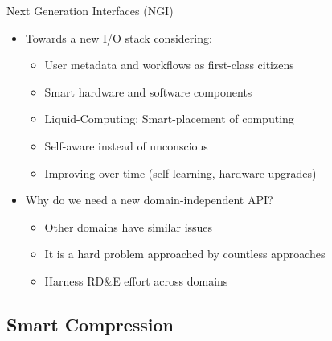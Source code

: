 \documentclass[compress,11pt,xcolor=svgnames,aspectratio=169]{beamer}
\begin{document}
\begin{frame}[fragile]{Next Generation Interfaces (NGI)}

\begin{itemize}
\setlength\itemsep{0.4cm}

\item Towards a new I/O stack considering:

  \begin{itemize}
  \setlength\itemsep{0.2cm}
    \item User metadata and workflows as first-class citizens
    \item Smart hardware and software components
    \item Liquid-Computing: Smart-placement of computing
    \item Self-aware instead of unconscious
    \item Improving over time (self-learning, hardware upgrades)
  \end{itemize}

\item Why do we need a new domain-independent API?

  \begin{itemize}
  \setlength\itemsep{0.2cm}
    \item Other domains have similar issues
    \item It is a hard problem approached by countless approaches
    \item Harness RD\&E effort across domains
  \end{itemize}

\end{itemize}

\end{frame}

\subsection{Smart Compression}
\end{document}
